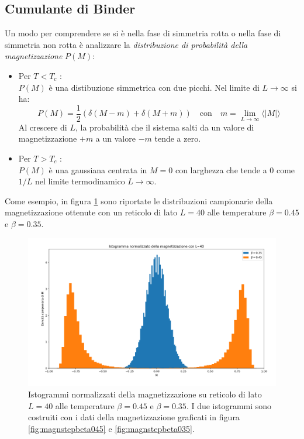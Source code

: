 \documentclass[10pt,a4paper]{article}
\begin{document}
\subsection{Cumulante di Binder}
Un modo per comprendere se si è nella fase di simmetria rotta o nella fase di simmetria non rotta è analizzare la \emph{distribuzione di probabilità della magnetizzazione} $P(M)$:
\begin{itemize}
	\item Per $T<T_c$ :\\
	$P(M)$ è una distibuzione simmetrica con due picchi. Nel limite di $L\rightarrow \infty$ si ha:
	\[
		P(M)=\frac{1}{2}\left(\delta(M-m)+\delta(M+m)\right) \quad \mathrm{con} \quad m=\lim_{L\to\infty} \langle |M| \rangle
	\]
	Al crescere di $L$, la probabilità che il sistema salti da un valore di magnetizzazione $+m$ a un valore $-m$ tende a zero.
	\item Per $T>T_c$ :\\
	$P(M)$ è una gaussiana centrata in $M=0$ con larghezza che tende a $0$ come $1/L$ nel limite termodinamico $L\to\infty$. 
\end{itemize}
Come esempio, in figura \ref{istogramma} sono riportate le distribuzioni campionarie della magnetizzazione ottenute con un reticolo di lato $L=40$ alle temperature $\beta=0.45$ e $\beta=0.35$.
\begin{figure}[h!]
	\centering
	\includegraphics[width=1\linewidth]{istogramma}
	\caption{Istogrammi normalizzati della magnetizzazione su reticolo di lato $L=40$ alle temperature $\beta=0.45$ e $\beta=0.35$. I due istogrammi sono costruiti con i dati della magnetizzazione graficati in figura \ref{fig:magnstepbeta045} e \ref{fig:magnstepbeta035}.}
	\label{istogramma}
\end{figure}
\end{document}
